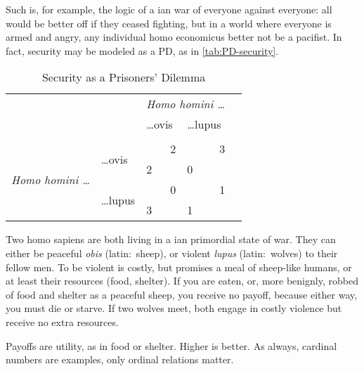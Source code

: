 Such is, for example, the logic of a \citeauthor{Hobbes-1651-aa}ian war of everyone against everyone:
all would be better off if they ceased fighting, but in a world where everyone is armed and angry, any individual homo economicus better not be a pacifist.
In fact, security may be modeled as a \gls{PD}, as in \autoref{tab:PD-security}.

\begin{table}
	\caption{Security as a Prisoners' Dilemma}
	\label{tab:PD-security}
	\begin{center}
	\begin{tabular}
		{m{1cm}
		m{}
		m{}
		m{}
		m{}}

&
& \multicolumn{2}{c}{\emph{Homo homini \ldots}}
\\


&
&\ldots ovis
& \ldots lupus
\\\\ %

\cline{3-4}


\multicolumn{1}{c}{\multirow{4}{*}{\emph{Homo homini \ldots}}}
& \multirow{2}{2,3cm}{\ldots ovis}
& 	\multicolumn{1}{|r|}{2}
& \multicolumn{1}{r|}{3}
\\


\multicolumn{1}{c}{}
& \multicolumn{1}{c}{}
& \multicolumn{1}{|l|}{2}
& \multicolumn{1}{l|}{0}
\\

\cline{3-4}

\multicolumn{1}{c}{}
& \multirow{2}{2,3cm}{\ldots lupus}
& \multicolumn{1}{|r|}{0}
& \multicolumn{1}{r|}{1}
\\


\multicolumn{1}{c}{}
& \multicolumn{1}{c}{}
& \multicolumn{1}{|l|}{3}
& \multicolumn{1}{l|}{1}
\\

\cline{3-4}
\end{tabular}
\end{center}
\scriptsize{
	Two homo sapiens are both living in a \citeauthor{Hobbes-1651-aa}ian primordial state of war.
	They can either be peaceful \emph{obis} (latin:\ sheep), or violent \emph{lupus} (latin:\ wolves) to their fellow men.
	To be violent is costly, but promises a meal of sheep-like humans, or at least their resources (food, shelter).
	If you are eaten, or, more benignly, robbed of food and shelter as a peaceful sheep, you receive no payoff, because either way, you must die or starve.
	If two wolves meet, both engage in costly violence but receive no extra resources.

	Payoffs are utility, as in food or shelter.
	Higher is better.
	As always, cardinal numbers are examples, only ordinal relations matter.}
\end{table}


